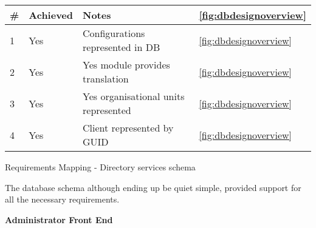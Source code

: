 	\begin{tablehere}
	
		\small{\begin{tabular}{ | p{5mm} | p{16mm} | p{100mm} | p{16mm} |}
		\hline
		\textbf{\#}							& \textbf{Achieved} 	& \textbf{Notes} 																			& \ref{fig:dbdesignoverview}													\\ \hline
		1	 	 	 						& Yes					& Configurations represented in DB															& \ref{fig:dbdesignoverview}													\\ \hline
		2	 	 	 						& Yes					& Yes module provides translation															& \ref{fig:dbdesignoverview}													\\ \hline
		3	 	 	 						& Yes					& Yes organisational units represented														& \ref{fig:dbdesignoverview}													\\ \hline
		4	 	 	 						& Yes					& Client represented by GUID																& \ref{fig:dbdesignoverview}													\\ \hline
	
		\end{tabular}}
		
		\caption{Requirements Mapping - Directory services schema}
		\label{tab:RequirementsMappingDirectoryservicesschema}
		
	\end{tablehere}
	
	\vspace{5mm}
	\normalsize
	{
		The database schema although ending up be quiet simple, provided support for all the necessary requirements.
	}
	
	
	\vspace{5mm}
	\large{\bfseries{Administrator Front End}}
	\vspace{4mm}
	
